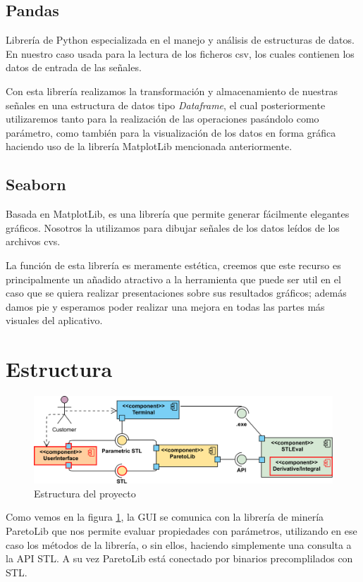  
 
\subsection{Pandas}
Librería de Python especializada en el manejo y análisis de estructuras de datos. En nuestro caso usada para la lectura de los ficheros csv, los cuales contienen los datos de entrada de las señales.

Con esta librería realizamos la transformación y almacenamiento de nuestras señales en una estructura de datos tipo \textit{Dataframe}, el cual posteriormente utilizaremos tanto para la realización de las operaciones pasándolo como parámetro, como también para la visualización de los datos en forma gráfica haciendo uso de la librería MatplotLib mencionada anteriormente. 
 
 

\subsection{Seaborn} 
Basada en MatplotLib, es una librería que permite generar fácilmente elegantes gráficos. Nosotros la utilizamos para dibujar señales de los datos leídos de los archivos cvs.

La función de esta librería es meramente estética, creemos que este recurso es principalmente un añadido atractivo a la herramienta que puede ser util en el caso que se quiera realizar presentaciones sobre sus resultados gráficos; además damos pie y esperamos poder realizar una mejora en todas las partes más visuales del aplicativo. 
 
 

\section{Estructura}
\begin{figure}[htb]
\centering
  \includegraphics[width=.95\linewidth]{images/uml_diagram} 
\caption{Estructura del proyecto}
\label{fig:est}
\end{figure}
Como vemos en la figura \ref{fig:est}, la GUI se comunica con la librería de minería ParetoLib que nos permite evaluar propiedades con parámetros, utilizando en ese caso los métodos de la librería, o sin ellos, haciendo simplemente una consulta a la API STL. A su vez ParetoLib está conectado por binarios precomplilados con STL.

